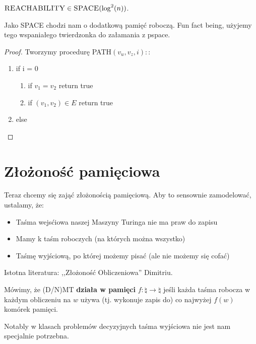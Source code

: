 \begin{theorem} [Savitch]
	\(  \textsc{REACHABILITY} \in \textsc{SPACE}( \log^2(n)) \).
\end{theorem}

Jako \textsc{SPACE} chodzi nam o dodatkową pamięć roboczą. Fun fact being, użyjemy tego wspaniałego twierdzonka do załamania \pspace z
pspace.

\begin{proof}
	Tworzymy procedurę \textsc{PATH}\( (v_u, v_z, i): \):

	\begin{enumerate}
		\item if i = 0
		      \begin{enumerate}
			      \item if \(v_1 = v_2 \) return true
			      \item if \( (v_1, v_2) \in E \) return true
		      \end{enumerate}
		\item else

	\end{enumerate}
\end{proof}

\section{Złożoność pamięciowa}

Teraz chcemy się zająć złożonością pamięciową. Aby to sensownie zamodelować, ustalamy, że:

\begin{itemize}
	\item Taśma wejsćiowa naszej Maszyny Turinga nie ma praw do zapisu
	\item Mamy k taśm roboczych (na których można wszystko)
	\item Taśmę wyjściową, po której możemy pisać (ale nie możemy się cofać)
\end{itemize}

Istotna literatura: ,,Złożoność Obliczeniowa'' Dimitriu.

\begin{definition}
	Mówimy, że (D/N)MT \textbf{działa w pamięci} \( f : \natural \rightarrow \natural \) jeśli każda taśma robocza  w każdym obliczeniu na \( w \)
	używa (tj. wykonuje zapis do) co najwyżej \( f(w) \) komórek pamięci.
\end{definition}

Notably w klasach problemów decyzyjnych taśma wyjściowa nie jest nam specjalnie potrzebna.

